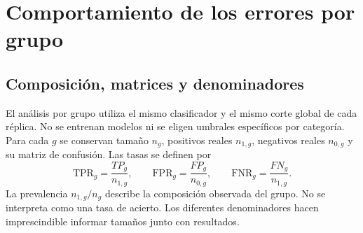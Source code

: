 \documentclass[11pt,a4paper]{article}
\begin{document}
\section{Comportamiento de los errores por grupo}
\subsection{Composición, matrices y denominadores}
El análisis por grupo utiliza el mismo clasificador y el mismo corte global de cada réplica. No se entrenan modelos ni se eligen umbrales específicos por categoría. Para cada $g$ se conservan tamaño $n_g$, positivos reales $n_{1,g}$, negativos reales $n_{0,g}$ y su matriz de confusión. Las tasas se definen por
\begin{equation}
\mathrm{TPR}_g=\frac{TP_g}{n_{1,g}},\qquad
\mathrm{FPR}_g=\frac{FP_g}{n_{0,g}},\qquad
\mathrm{FNR}_g=\frac{FN_g}{n_{1,g}}.
\end{equation}
La prevalencia $n_{1,g}/n_g$ describe la composición observada del grupo. No se interpreta como una tasa de acierto. Los diferentes denominadores hacen imprescindible informar tamaños junto con resultados.
\end{document}
